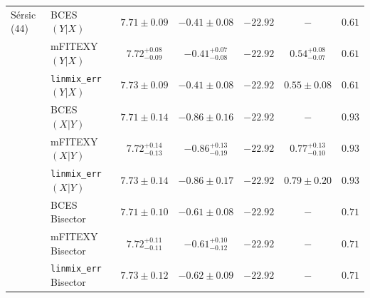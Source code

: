 \documentclass[preprint2]{emulateapj}
\begin{document}
\begin{table}
\begin{tabular}{llccccc}
S\'ersic (44) & BCES $(Y|X)$   & $7.71 \pm 0.09$ & $-0.41 \pm 0.08$ & $-22.92$ & $-$    & $0.61$ \\
              & mFITEXY $(Y|X)$   & $7.72^{+0.08}_{-0.09}$ & $-0.41^{+0.07}_{-0.08}$ & $-22.92$ & $0.54^{+0.08}_{-0.07}$ & $0.61$ \\
              & {\tt linmix\_err} $(Y|X)$  & $7.73 \pm 0.09$ & $-0.41 \pm 0.08$ & $-22.92$ & $0.55 \pm 0.08$ & $0.61$ \\ [0.5em]
              & BCES $(X|Y)$   & $7.71 \pm 0.14$ & $-0.86 \pm 0.16$ & $-22.92$ & $-$    & $0.93$ \\
              & mFITEXY $(X|Y)$   & $7.72^{+0.14}_{-0.13}$ & $-0.86^{+0.13}_{-0.19}$ & $-22.92$ & $0.77^{+0.13}_{-0.10}$ & $0.93$ \\
              & {\tt linmix\_err} $(X|Y)$  & $7.73 \pm 0.14$ & $-0.86 \pm 0.17$ & $-22.92$ & $0.79 \pm  0.20$ & $0.93$ \\ [0.5em]
              & BCES Bisector  & $7.71 \pm 0.10$  & $-0.61 \pm 0.08$ & $-22.92$ & $-$    & $0.71$ \\
              & mFITEXY Bisector  & $7.72^{+0.11}_{-0.11}$ & $-0.61^{+0.10}_{-0.12}$ & $-22.92$ & $-$                    & $0.71$ \\
              & {\tt linmix\_err} Bisector & $7.73 \pm 0.12$ & $-0.62 \pm 0.09$ & $-22.92$ & $-$    & $0.71$ \\ [0.5em]


\end{tabular}
\end{table}
\end{document}
